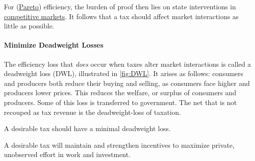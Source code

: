 For (\hyperref[sec:Pareto]{Pareto}) efficiency, the burden of proof then lies on state interventions in \hyperref[sec:CompetitiveMarkets]{competitive markets}.
It follows that a tax should affect market interactions as little as possible.

\paragraph{Minimize Deadweight Losses}
The efficiency loss that \emph{does} occur when taxes alter market interactions is called a deadweight loss (DWL), illustrated in \autoref{fig:DWL}.
It arises as follows:
consumers and producers both reduce their buying and selling, as consumers face higher and producers lower prices.
This reduces the welfare, or surplus of consumers and producers.
Some of this loss is transferred to government.
The net that is not recouped as tax revenue is the deadweight-loss of taxation.


\begin{desideratum}
	A desirable tax should have a minimal deadweight loss.
	\label{des:DWL}
\end{desideratum}

\begin{desideratum}[Incentives]%
	A desirable tax will maintain and strengthen incentives to maximize private, unobserved effort in work and investment.
	\label{des:Incentives}
\end{desideratum}


